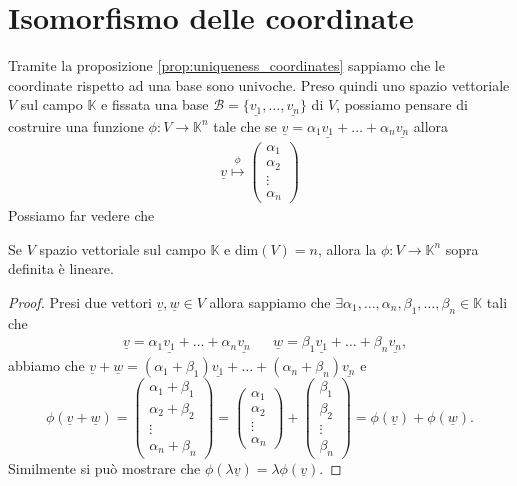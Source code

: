 \section{Isomorfismo delle coordinate}
Tramite la proposizione \ref{prop:uniqueness_coordinates} sappiamo che le coordinate rispetto ad una base sono univoche. Preso quindi uno spazio vettoriale $V$ sul campo $\mathbb{K}$ e fissata una base $\mathcal{B} = \{ \underline{v_1}, \ldots, \underline{v_n} \}$ di $V$, possiamo pensare di costruire una funzione $\phi : V \to \mathbb{K}^n$ tale che se $\underline{v} = \alpha_1 \underline{v_1} + \ldots + \alpha_n \underline{v_n}$ allora
\begin{align}
  \underline{v} \stackrel{\phi}{\mapsto} \begin{pmatrix}
    \alpha_1 \\
    \alpha_2 \\
    \vdots \\
    \alpha_n
  \end{pmatrix} \label{eq:isomorf_coord}
\end{align}
Possiamo far vedere che
\begin{prop}
  Se $V$ spazio vettoriale sul campo $\mathbb{K}$ e $\text{dim}(V) = n$, allora la $\phi: V \to \mathbb{K}^n$ sopra definita è lineare.
\end{prop}
\begin{proof}
  Presi due vettori $\underline{v}, \underline{w} \in V$ allora sappiamo che $\exists \alpha_1, \ldots, \alpha_n, \beta_1, \ldots, \beta_n \in \mathbb{K}$ tali che
  \begin{align}
    &\underline{v} = \alpha_1 \underline{v_1} + \ldots + \alpha_n \underline{v_n} & &\underline{w} = \beta_1 \underline{v_1} + \ldots + \beta_n \underline{v_n},
  \end{align}
  abbiamo che $\underline{v} + \underline{w} = (\alpha_1 + \beta_1) \underline{v_1} + \ldots + (\alpha_n + \beta_n) \underline{v_n}$ e
  $$
    \phi(\underline{v} + \underline{w}) = \begin{pmatrix}
      \alpha_1 + \beta_1 \\
      \alpha_2 + \beta_2 \\
      \vdots \\
      \alpha_n + \beta_n
    \end{pmatrix} = \begin{pmatrix}
      \alpha_1 \\
      \alpha_2 \\
      \vdots \\
      \alpha_n
    \end{pmatrix} + \begin{pmatrix} \beta_1 \\
      \beta_2 \\
      \vdots \\
      \beta_n
    \end{pmatrix} = \phi(\underline{v}) + \phi(\underline{w}).
  $$
  Similmente si può mostrare che $\phi(\lambda \underline{v}) = \lambda \phi(\underline{v})$.
\end{proof}
